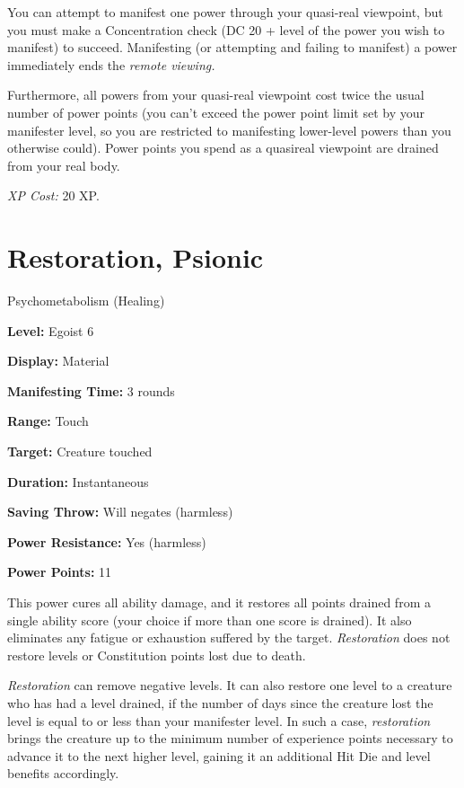 \documentclass{article}
\begin{document}
You can attempt to manifest one power through your quasi-real viewpoint, but you 
must make a Concentration check (DC 20 + level of the power you wish to manifest) 
to succeed. Manifesting (or attempting and failing to manifest) a power immediately 
ends the \textit{remote viewing.}

Furthermore, all powers from your quasi-real viewpoint cost twice the usual number 
of power points (you can't exceed the power point limit set by your manifester 
level, so you are restricted to manifesting lower-level powers than you otherwise 
could). Power points you spend as a quasireal viewpoint are drained from your real 
body.

\textit{XP Cost: }20 XP.

\vspace{12pt}
\section*{Restoration, Psionic}

Psychometabolism (Healing)

\textbf{Level:} Egoist 6

\textbf{Display:} Material

\textbf{Manifesting Time:} 3 rounds

\textbf{Range:} Touch

\textbf{Target:} Creature touched

\textbf{Duration:} Instantaneous

\textbf{Saving Throw:} Will negates (harmless)

\textbf{Power Resistance:} Yes (harmless)

\textbf{Power Points:} 11

This power cures all ability damage, and it restores all points drained from a 
single ability score (your choice if more than one score is drained). It also eliminates 
any fatigue or exhaustion suffered by the target. \textit{Restoration }does not 
restore levels or Constitution points lost due to death.

\textit{Restoration }can remove negative levels. It can also restore one level 
to a creature who has had a level drained, if the number of days since the creature 
lost the level is equal to or less than your manifester level. In such a case, 
\textit{restoration }brings the creature up to the minimum number of experience 
points necessary to advance it to the next higher level, gaining it an additional 
Hit Die and level benefits accordingly.
\end{document}
